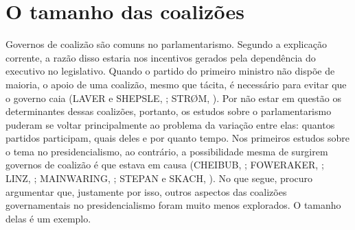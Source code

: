 \section{O tamanho das coalizões}
\label{sec:revisao}

Governos de coalizão são comuns no parlamentarismo. Segundo a explicação corrente, a razão disso estaria nos incentivos gerados pela dependência do executivo no legislativo. Quando o partido do primeiro ministro não dispõe de maioria, o apoio de uma coalizão, mesmo que tácita, é necessário para evitar que o governo caia (LAVER e SHEPSLE, \citeyear{laver1996}; STR\O{}M, \citeyear{strom1990}). Por não estar em questão os determinantes dessas coalizões, portanto, os estudos sobre o parlamentarismo puderam se voltar principalmente ao problema da variação entre elas: quantos partidos participam, quais deles e por quanto tempo. Nos primeiros estudos sobre o tema no presidencialismo, ao contrário, a possibilidade mesma de surgirem governos de coalizão é que estava em causa (CHEIBUB, \citeyear{cheibub2002}; FOWERAKER, \citeyear{foweraker1998}; LINZ, \citeyear{linz1990}; MAINWARING, \citeyear{mainwaring1993}; STEPAN e SKACH, \citeyear{stepan1993}). No que segue, procuro argumentar que, justamente por isso, outros aspectos das coalizões governamentais no presidencialismo foram muito menos explorados. O tamanho delas é um exemplo.



